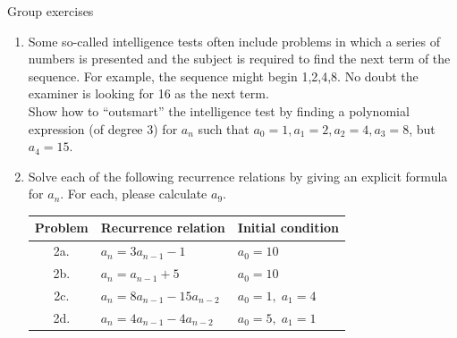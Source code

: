 \documentclass[10pt]{beamer}
\begin{document}
\begin{frame}{Group exercises}
\begin{enumerate}
	\item Some so-called intelligence tests often include problems in which a series of numbers is presented and the subject is required to find the next term of the sequence.  For example, the sequence might begin 1,2,4,8.  No doubt the examiner is looking for 16 as the next term. \\
	\vspace{.25cm}
	Show how to \enquote{outsmart} the intelligence test by finding a polynomial expression (of degree 3) for $a_n$ such that $a_0=1, a_1=2, a_2=4, a_3=8$, but $a_4=15$.
	\vfill \vfill 
	\item Solve each of the following recurrence relations by giving an explicit formula for $a_n$.  For each, please calculate $a_9$.
	\vspace{.5cm}
	\begin{tabular}{cll}
	\toprule 
	\textbf{Problem} & \textbf{Recurrence relation} & \textbf{Initial condition} \\
	\midrule 
	2a. & $a_n = 3 a_{n-1} -1$ & $ a_0=10$ \\
	2b. &  $a_n = a_{n-1} + 5$ & $  a_0=10$ \\
	2c. & $a_n = 8 a_{n-1} - 15a_{n-2}$ & $a_0=1, \; a_1=4$ \\
	2d. & $a_n = 4 a_{n-1} -4 a_{n-2}$ & $a_0=5, \; a_1=1$ \\
	\bottomrule
	\end{tabular}

\end{enumerate}
\end{frame}
\end{document}
